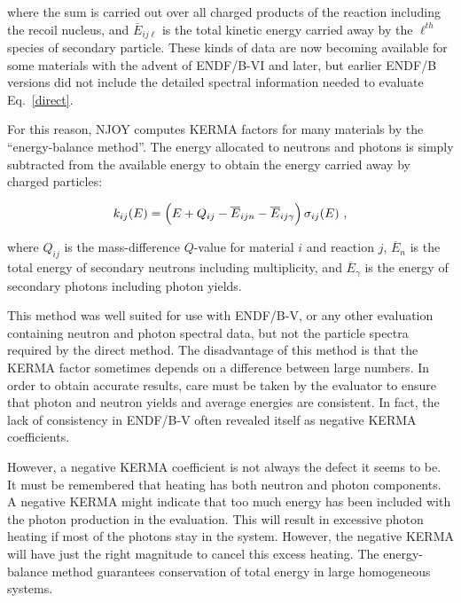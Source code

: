 \noindent
where the sum is carried out over all charged products of the reaction
including the recoil nucleus, and $\overline{E}_{ij\ell}$ is the total
kinetic energy carried away by the $\ell^{th}$ species of secondary
particle.  These kinds of data are now becoming available for some
materials with the advent of ENDF/B-VI and later, but earlier
ENDF/B versions did not include the detailed spectral information
needed to evaluate Eq.~\ref{direct}.

For this reason, NJOY computes KERMA factors for many materials by
the ``energy-balance method''\cite{Muir}.
The energy allocated to neutrons and photons is simply subtracted
from the available energy to obtain the energy carried away by
charged particles:

\begin{equation}
   k_{ij}(E)=\Bigl(E+Q_{ij}-\overline{E}_{ijn}-\overline{E}_{ij\gamma}
      \Bigr)\,\sigma_{ij}(E)\,\,,
\label{kij}
\end{equation}
\vspace{0.5 pt}

\noindent
where $Q_{ij}$ is the mass-difference $Q$-value for material $i$ and
reaction $j$, $\overline{E}_n$ is the total energy of secondary
neutrons including multiplicity, and $\overline{E}_\gamma$ is the
energy of secondary photons including photon yields.

This method was well suited for use with ENDF/B-V,
or any other evaluation containing neutron and photon spectral
data, but not the
particle spectra required by the direct method.  The disadvantage
of this method is that the KERMA factor sometimes depends on a
difference between large numbers.  In order to obtain accurate
results, care must be taken by the evaluator to ensure
that photon and neutron yields and average energies are consistent.
In fact, the lack of consistency in ENDF/B-V often revealed itself
as negative KERMA coefficients\cite{ebal}.

However, a negative KERMA coefficient is not always the defect it
seems to be.  It must be remembered that heating has both neutron and
photon components.  A negative KERMA might indicate that too much
energy has been included with the photon production in the evaluation.
This will result in excessive photon heating if most of the photons
stay in the system.  However, the negative KERMA will have just the
right magnitude to cancel this excess heating. The energy-balance
method guarantees conservation of total energy in large homogeneous
systems.

